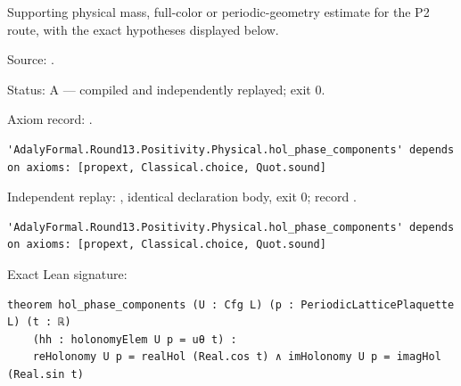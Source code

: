 \begin{theorem}[bp-480]
\label{bp-480}
\uses{}
\leanok
Supporting physical mass, full-color or periodic-geometry estimate for the P2 route, with the exact hypotheses displayed below.

\par Source: \texttt{}.
\par Status: A — compiled and independently replayed; exit 0.
\par Axiom record: \texttt{}.
\begin{verbatim}
'AdalyFormal.Round13.Positivity.Physical.hol_phase_components' depends on axioms: [propext, Classical.choice, Quot.sound]
\end{verbatim}
\par Independent replay: \texttt{}, identical declaration body, exit 0; record \texttt{}.
\begin{verbatim}
'AdalyFormal.Round13.Positivity.Physical.hol_phase_components' depends on axioms: [propext, Classical.choice, Quot.sound]
\end{verbatim}
\par Exact Lean signature:
\begin{verbatim}
theorem hol_phase_components (U : Cfg L) (p : PeriodicLatticePlaquette L) (t : ℝ)
    (hh : holonomyElem U p = uθ t) :
    reHolonomy U p = realHol (Real.cos t) ∧ imHolonomy U p = imagHol (Real.sin t)
\end{verbatim}
\end{theorem}

